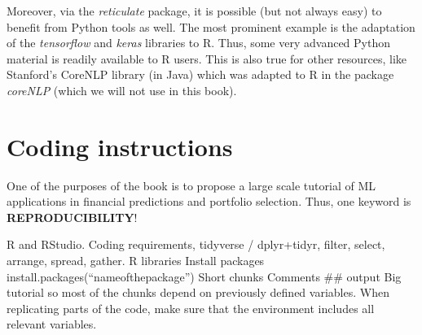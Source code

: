 \documentclass[]{krantz}
\theoremstyle{definition}
\theoremstyle{definition}
\theoremstyle{definition}
\theoremstyle{remark}
\begin{document}
Moreover, via the \emph{reticulate} package, it is possible (but not
always easy) to benefit from Python tools as well. The most prominent
example is the adaptation of the \emph{tensorflow} and \emph{keras}
libraries to R. Thus, some very advanced Python material is readily
available to R users. This is also true for other resources, like
Stanford's CoreNLP library (in Java) which was adapted to R in the
package \emph{coreNLP} (which we will not use in this book).

\hypertarget{coding-instructions}{%
\section{Coding instructions}\label{coding-instructions}}

One of the purposes of the book is to propose a large scale tutorial of
ML applications in financial predictions and portfolio selection. Thus,
one keyword is \textbf{REPRODUCIBILITY}!

R and RStudio. Coding requirements, tidyverse / dplyr+tidyr, filter,
select, arrange, spread, gather. R libraries Install packages
install.packages(``nameofthepackage'') Short chunks Comments \#\# output
Big tutorial so most of the chunks depend on previously defined
variables. When replicating parts of the code, make sure that the
environment includes all relevant variables.
\end{document}

